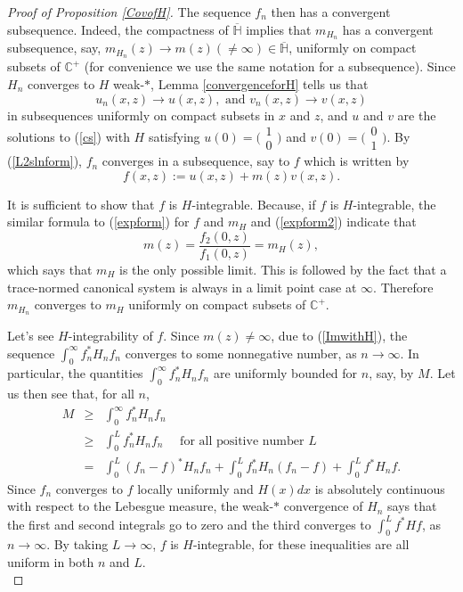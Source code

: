\documentclass[preprint,12pt]{elsarticle}
\newcommand{\C}{{\mathbb C}}
\begin{document}
\begin{proof}[Proof of Proposition \ref{CovofH}]
The sequence $f_n$ then has a convergent subsequence. Indeed, the compactness of $\overline{\mathbb H}$ implies that $m_{H_n}$ has a convergent subsequence, say, $m_{H_n}(z)\to m(z)(\neq\infty)\in\overline{\mathbb{H}}$, uniformly on compact subsets of $\C^+$ (for convenience we use the same notation for a subsequence). Since  $H_n$ converges to $H$ weak-$*$,  Lemma \ref{convergenceforH} tells us that 
\begin{equation*}
u_n(x,z)\to u(x,z), \textrm{ and } v_n(x,z)\to v(x,z)
\end{equation*}
in subsequences uniformly on compact subsets in $x$ and $z$, and $u$ and $v$ are the solutions to (\ref{cs}) with $H$ satisfying  $u(0)=\big( \begin{smallmatrix} 1 \\ 0 \end{smallmatrix}\big)$ and $v(0)=\big( \begin{smallmatrix} 0 \\ 1 \end{smallmatrix}\big)$. 
By (\ref{L2slnform}), $f_n$ converges in a subsequence, say to $f$ which is written by  
\begin{equation}
\label{expform2}
f(x,z):=u(x,z)+m(z)v(x,z). 
\end{equation}

It is sufficient to show that $f$ is $H$-integrable. Because, if $f$ is $H$-integrable, the similar formula to (\ref{expform}) for $f$ and $m_H$ and (\ref{expform2}) indicate that  
\begin{equation*}
m(z)=\frac{f_{2}(0,z)}{f_{1}(0,z)}=m_{H}(z),
\end{equation*}
which says that $m_H$ is the only possible limit. This is followed by the fact that a trace-normed canonical system is always in a limit point case at $\infty$. Therefore  $m_{H_n}$ converges to $m_H$ uniformly on compact subsets of $\C^+$. 

Let's see $H$-integrability of $f$. Since $m(z)\neq\infty$, due to (\ref{ImwithH}), the sequence $\int_0^{\infty}f_n^*H_nf_n$ converges to some nonnegative number, as $n\to\infty$.  In particular,  the quantities $\int_0^{\infty}f_n^*H_nf_n$ are uniformly bounded for $n$, say, by $M$. Let us then see that, for all $n$,  
\begin{eqnarray*}
M &\ge& \int_0^{\infty}f_n^*H_nf_n \\
   &\ge& \int_0^Lf_n^*H_nf_n \quad \textrm{ for all positive number } L\\
   &=& \int_0^L(f_n-f)^*H_nf_n+\int_0^Lf_n^*H_n(f_n-f)+\int_0^Lf^*H_nf.
\end{eqnarray*}
Since $f_n$ converges to $f$ locally uniformly and $H(x)dx$ is absolutely continuous with respect to the Lebesgue measure, the weak-$*$ convergence of $H_n$ says that the first and second integrals go to zero and the third converges to $\int_0^Lf^*Hf$, as $n\to\infty$. By taking $L\to\infty$, $f$ is $H$-integrable, for these inequalities are all uniform in both $n$ and $L$.\\


\end{proof}
\end{document}
